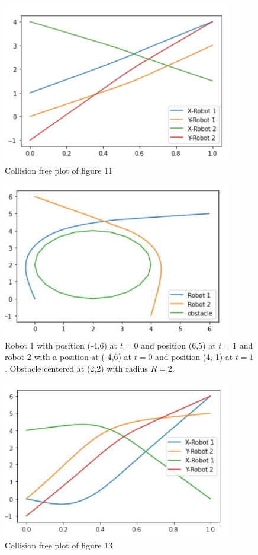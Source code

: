 \begin{figure}[H]
    \centering
    \includegraphics[width=10cm]{Graphs/Two Robots Intersecting (2).png}
    \caption{Collision free plot of figure 11} 
    \label{fig:my_label}
\end{figure}




\begin{figure}[H]
    \centering
    \includegraphics[width=10cm]{Graphs/plot for two robots and one obstacle.JPG}
    \caption{Robot 1 with position (-4,6) at \( t = 0 \) and position (6,5) at \( t = 1 \) and robot 2 with a position at (-4,6) at \( t = 0 \) and position (4,-1) at \( t = 1 \). Obstacle centered at  (2,2) with radius \( R = 2 \).}
    \label{fig:my_label}
\end{figure}

\begin{figure}[H]
    \centering
    \includegraphics[width=10cm]{Graphs/Two Robots intersecting (3).JPG}
    \caption{Collision free plot of figure 13}
    \label{fig:my_label}
\end{figure}

